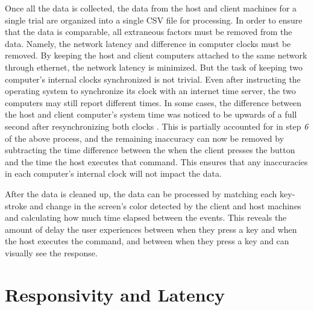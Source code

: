 \noindent
Once all the data is collected, the data from the host and client machines for a single trial are organized into a single CSV file for processing.
In order to ensure that the data is comparable, all extraneous factors must be removed from the data.
Namely, the network latency and difference in computer clocks must be removed.
By keeping the host and client computers attached to the same network through ethernet, the network latency is minimized.
But the task of keeping two computer's internal clocks synchronized is not trivial.
Even after instructing the operating system to synchronize its clock with an internet time server, the two computers may still report different times.
In some cases, the difference between the host and client computer's system time was noticed to be upwards of a full second after resynchronizing both clocks \cite{time.is}.
This is partially accounted for in step \emph{6} of the above process, and the remaining inaccuracy can now be removed by subtracting the time difference between the when the client presses the button and the time the host executes that command.
This ensures that any inaccuracies in each computer's internal clock will not impact the data.

After the data is cleaned up, the data can be processed by matching each key-stroke and change in the screen's color detected by the client and host machines and calculating how much time elapsed between the events.
This reveals the amount of delay the user experiences between when they press a key and when the host executes the command, and between when they press a key and can visually see the response.


\section{Responsivity and Latency}\label{sec:ResponsivityAndLatency}


